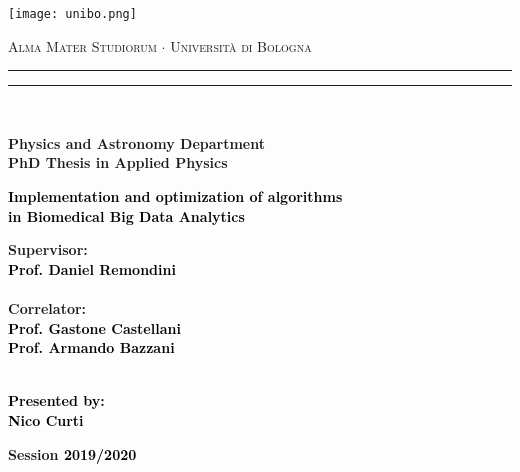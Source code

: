 \documentclass{standalone}
\begin{document}
\begin{titlepage}

\centering
\texttt{[image: unibo.png]}

\begin{center}
{{\Large{\textsc{Alma Mater Studiorum $\cdot$ Universit\`a di Bologna}}}}
\rule[0.1cm]{15.8cm}{0.1mm}
\rule[0.5cm]{15.8cm}{0.6mm}
\\\vspace{3mm}

{\small{\bf Physics and Astronomy Department\\PhD Thesis in Applied Physics}}

\end{center}

\vspace{23mm}

\begin{center}\textcolor{black}{
{\Large{\bf Implementation and optimization of algorithms\\in Biomedical Big Data Analytics}}\\
}\end{center}

\vspace{40mm} \par \noindent

\begin{minipage}[t]{\textwidth}
{\large{\bf Supervisor: \vspace{2mm}\\\textcolor{black}{
Prof. Daniel Remondini}}}\\\\
{\large{\bf Correlator: \vspace{2mm}\\\textcolor{black}{
Prof. Gastone Castellani\\
Prof. Armando Bazzani}}}\\\\
\end{minipage}


\hfill

\begin{minipage}[t]{\textwidth}\raggedleft \textcolor{black}{
{\large{\bf Presented by:
\vspace{2mm}\\
Nico Curti}}}
\end{minipage}

\vspace{17mm}

\begin{center}
{\large{\bf Session \textcolor{black}{2019/2020}
}}
\end{center}

\end{titlepage}
\end{document}
